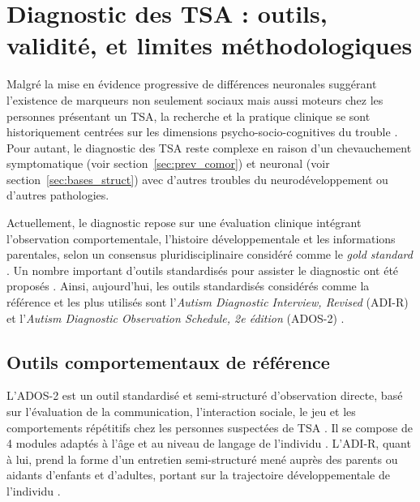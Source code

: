 \section{Diagnostic des TSA : outils, validité, et limites méthodologiques}
Malgré la mise en évidence progressive de différences neuronales suggérant l'existence de marqueurs non seulement sociaux mais aussi moteurs chez les personnes présentant un TSA, la recherche et la pratique clinique se sont historiquement centrées sur les dimensions psycho-socio-cognitives du trouble \parencite{cook_movement_2016}. Pour autant, le diagnostic des TSA reste complexe en raison d'un chevauchement symptomatique (voir section~\ref{sec:prev_comor}) et neuronal (voir section~\ref{sec:bases_struct}) avec d'autres troubles du neurodéveloppement ou d'autres pathologies. 

Actuellement, le diagnostic repose sur une évaluation clinique intégrant l'observation comportementale, l'histoire développementale et les informations parentales, selon un consensus pluridisciplinaire considéré comme le \textit{gold standard} \parencites[p.~52]{HAS2018_TSA}{Randall2018Jul, Hirota2023Jan, falkmer_diagnostic_2013, Woolfenden2012Jan}. Un nombre important d'outils standardisés pour assister le diagnostic ont été proposés \parencites[p.~51]{HAS2018_TSA}{falkmer_diagnostic_2013, Randall2018Jul}. Ainsi, aujourd'hui, les outils standardisés considérés comme la référence et les plus utilisés sont l'\textit{Autism Diagnostic Interview, Revised} (ADI-R) et l'\textit{Autism Diagnostic Observation Schedule, 2e édition} (ADOS-2) \parencite{Hirota2023Jan, frigaux_ladi-r_2019}.



\subsection{Outils comportementaux de référence} %

L'ADOS-2 est un outil standardisé et semi-structuré d'observation directe, basé sur l'évaluation de la communication, l'interaction sociale, le jeu et les comportements répétitifs chez les personnes suspectées de TSA \parencite{Lord2012ADOS2}. Il se compose de 4 modules adaptés à l'âge et au niveau de langage de l'individu \parencite{Lord2012ADOS2}. L'ADI-R, quant à lui, prend la forme d'un entretien semi-structuré mené auprès des parents ou aidants d'enfants et d'adultes, portant sur la trajectoire développementale de l'individu \parencite{Lord1994Oct}. 

